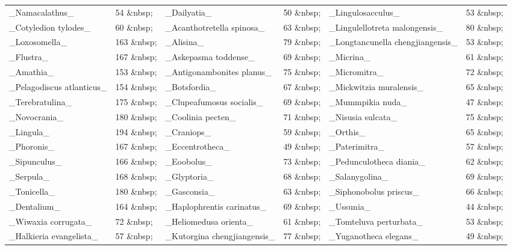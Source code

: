 \documentclass[openany]{book}
\theoremstyle{definition}
\theoremstyle{definition}
\theoremstyle{definition}
\theoremstyle{remark}
\begin{document}
\begin{tabular}{l|l|l|l|l|l}
\hline
 &  &  &  &  & \\
\hline
\_Namacalathus\_ & 54   \&nbsp; & \_Dailyatia\_ & 50   \&nbsp; & \_Lingulosacculus\_ & 53   \&nbsp;\\
\hline
\_Cotyledion tylodes\_ & 60   \&nbsp; & \_Acanthotretella spinosa\_ & 63   \&nbsp; & \_Lingulellotreta malongensis\_ & 80   \&nbsp;\\
\hline
\_Loxosomella\_ & 163   \&nbsp; & \_Alisina\_ & 79   \&nbsp; & \_Longtancunella chengjiangensis\_ & 53   \&nbsp;\\
\hline
\_Flustra\_ & 167   \&nbsp; & \_Askepasma toddense\_ & 69   \&nbsp; & \_Micrina\_ & 61   \&nbsp;\\
\hline
\_Amathia\_ & 153   \&nbsp; & \_Antigonambonites planus\_ & 75   \&nbsp; & \_Micromitra\_ & 72   \&nbsp;\\
\hline
\_Pelagodiscus atlanticus\_ & 154   \&nbsp; & \_Botsfordia\_ & 67   \&nbsp; & \_Mickwitzia muralensis\_ & 65   \&nbsp;\\
\hline
\_Terebratulina\_ & 175   \&nbsp; & \_Clupeafumosus socialis\_ & 69   \&nbsp; & \_Mummpikia nuda\_ & 47   \&nbsp;\\
\hline
\_Novocrania\_ & 180   \&nbsp; & \_Coolinia pecten\_ & 71   \&nbsp; & \_Nisusia sulcata\_ & 75   \&nbsp;\\
\hline
\_Lingula\_ & 194   \&nbsp; & \_Craniops\_ & 59   \&nbsp; & \_Orthis\_ & 65   \&nbsp;\\
\hline
\_Phoronis\_ & 167   \&nbsp; & \_Eccentrotheca\_ & 49   \&nbsp; & \_Paterimitra\_ & 57   \&nbsp;\\
\hline
\_Sipunculus\_ & 166   \&nbsp; & \_Eoobolus\_ & 73   \&nbsp; & \_Pedunculotheca diania\_ & 62   \&nbsp;\\
\hline
\_Serpula\_ & 168   \&nbsp; & \_Glyptoria\_ & 68   \&nbsp; & \_Salanygolina\_ & 69   \&nbsp;\\
\hline
\_Tonicella\_ & 180   \&nbsp; & \_Gasconsia\_ & 63   \&nbsp; & \_Siphonobolus priscus\_ & 66   \&nbsp;\\
\hline
\_Dentalium\_ & 164   \&nbsp; & \_Haplophrentis carinatus\_ & 69   \&nbsp; & \_Ussunia\_ & 44   \&nbsp;\\
\hline
\_Wiwaxia corrugata\_ & 72   \&nbsp; & \_Heliomedusa orienta\_ & 61   \&nbsp; & \_Tomteluva perturbata\_ & 53   \&nbsp;\\
\hline
\_Halkieria evangelista\_ & 57   \&nbsp; & \_Kutorgina chengjiangensis\_ & 77   \&nbsp; & \_Yuganotheca elegans\_ & 49   \&nbsp;\\
\hline
\end{tabular}
\end{document}
